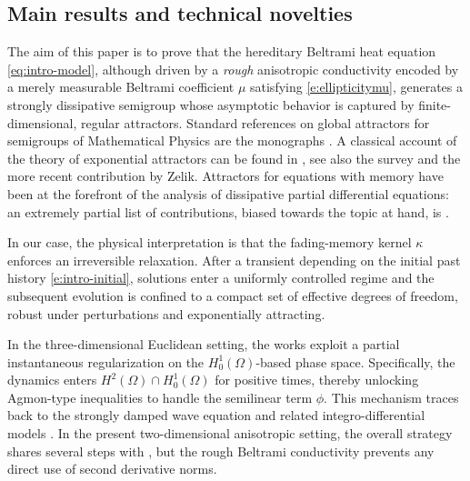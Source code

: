 \documentclass[12pt,leqno]{amsart}
\theoremstyle{definition}
\numberwithin{equation}{section}
\numberwithin{figure}{section}
\begin{document}
\subsection{Main results and technical novelties}\label{subsec:main-results}

The aim of this paper is to prove that the hereditary Beltrami heat equation \eqref{eq:intro-model},
although driven by a \emph{rough} anisotropic conductivity encoded by a merely measurable Beltrami
coefficient $\mu$ satisfying \eqref{e:ellipticitymu}, generates a strongly dissipative semigroup whose
asymptotic behavior is captured by finite-dimensional, regular attractors. Standard references on global attractors for semigroups of Mathematical Physics are the monographs \cites{CV,HAL,TEM}. A classical account of the theory of  exponential attractors  can be found in \cite{EFNT}, see also the survey \cite{MZ} and the more recent contribution \cite{Z2023} by Zelik. Attractors for equations with memory have been at the forefront of the analysis of dissipative partial differential equations: an extremely partial list of contributions, biased towards the topic at hand, is \cites{CDP,DaneseGeredeliPata2015DCDS,DellOroMammeri2021AMO, DiPlinioGiorginiPataTemam2018JNS,GattiGrasselliMiranvillePataSquassina2005DCDS,GGMP2010, GattiGrasselliPata2004PhysD,GrasselliPata2005JEE,KloedenRealSun2011CPAA,LiYang2023JDDE, Shomberg2020TMNA}. 


In our case, the  physical interpretation is that the fading-memory kernel $\kappa$ enforces an
irreversible relaxation. After a transient depending on the initial past history \eqref{e:intro-initial},
solutions enter a uniformly controlled regime and the subsequent evolution is confined to a compact set
of effective degrees of freedom, robust under perturbations and exponentially attracting. 

In the three-dimensional Euclidean setting, the works \cites{CGDP2010,AMN} exploit a partial instantaneous
regularization on the $H^1_0(\Omega)$-based phase space. Specifically, the dynamics enters $H^2(\Omega)\cap H^1_0(\Omega)$
for positive times, thereby unlocking Agmon-type inequalities to handle the semilinear term $\phi$.
This mechanism traces back to the strongly damped wave equation \cite{PZ} and related integro-differential
models \cite{DP1,DP2,DPZ}.
In the present two-dimensional anisotropic setting, the overall strategy shares several steps with \cite{CGDP2010}, but the rough Beltrami conductivity prevents any direct use of second derivative norms. 
\end{document}
